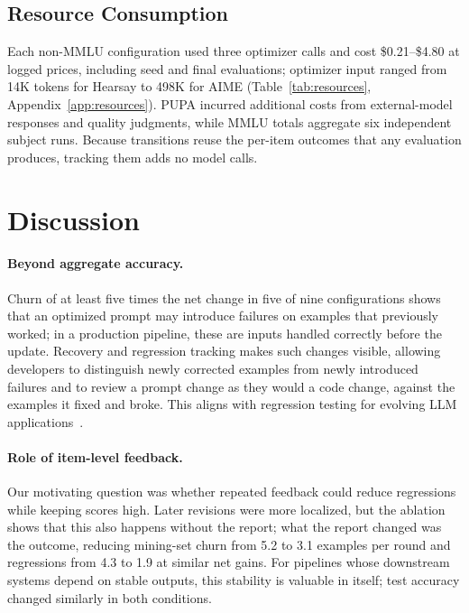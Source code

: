 \documentclass[11pt]{article}
\begin{document}
\subsection{Resource Consumption}
\label{sec:resources}

Each non-MMLU configuration used three optimizer calls and cost \$0.21--\$4.80 at logged prices, including seed and final evaluations; optimizer input ranged from 14K tokens for Hearsay to 498K for AIME (Table~\ref{tab:resources}, Appendix~\ref{app:resources}). PUPA incurred additional costs from external-model responses and quality judgments, while MMLU totals aggregate six independent subject runs. Because transitions reuse the per-item outcomes that any evaluation produces, tracking them adds no model calls.

\section{Discussion}
\label{sec:discussion}

\paragraph{Beyond aggregate accuracy.}
Churn of at least five times the net change in five of nine configurations shows that an optimized prompt may introduce failures on examples that previously worked; in a production pipeline, these are inputs handled correctly before the update. Recovery and regression tracking makes such changes visible, allowing developers to distinguish newly corrected examples from newly introduced failures and to review a prompt change as they would a code change, against the examples it fixed and broke. This aligns with regression testing for evolving LLM applications~\citep{ma2024regression}.

\paragraph{Role of item-level feedback.}
Our motivating question was whether repeated feedback could reduce regressions while keeping scores high. Later revisions were more localized, but the ablation shows that this also happens without the report; what the report changed was the outcome, reducing mining-set churn from 5.2 to 3.1 examples per round and regressions from 4.3 to 1.9 at similar net gains. For pipelines whose downstream systems depend on stable outputs, this stability is valuable in itself; test accuracy changed similarly in both conditions.
\end{document}
